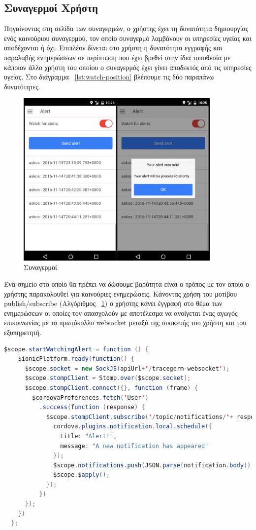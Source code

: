 \subsection{Συναγερμοί Χρήστη}
Πηγαίνοντας στη σελίδα των συναγερμών, ο χρήστης έχει τη δυνατότητα δημιουργίας ενός καινούριου συναγερμού, τον οποίο συναγερμό λαμβάνουν οι υπηρεσίες υγείας και αποδέχονται ή όχι. Επιπλέον δίνεται στο χρήστη η δυνατότητα εγγραφής και παραλαβής ενημερώσεων σε περίπτωση που έχει βρεθεί στην ίδια τοποθεσία με κάποιον άλλο χρήστη του οποίου ο συναγερμός έχει γίνει αποδεκτός από τις υπηρεσίες υγείας. Στο διάγραμμα ~\ref{lst:watch-position} βλέπουμε τις δύο παραπάνω δυνατότητες. 

\begin{figure}[h]
  \centering
  \includegraphics[width=100mm]{images/alerts.jpg}
  \caption{Συναγερμοί}
  \label{fig:alerts}
\end{figure}

\newpage

Ένα σημείο στο οποίο θα πρέπει να δώσουμε βαρύτητα είναι ο τρόπος με τον οποίο ο χρήστης παρακολουθεί για καινούριες ενημερώσεις. Κάνοντας χρήση του μοτίβου publish/subscribe (Αλγόριθμος ~\ref{fig:alerts}) ο χρήστης κάνει έγγραφή στο θέμα των ενημερώσεων οι οποίες τον απασχολούν με αποτέλεσμα να ανοίγεται ένας αγωγός επικοινωνίας με το πρωτόκολλο websocket μεταξύ της συσκευής του χρήστη και του εξυπηρετητή.

\begin{lstlisting}[language=Java, caption=Publish/Subscribe για ενημερώσεις, label={lst:publish_subscribe_notifications}]
$scope.startWatchingAlert = function () {
    $ionicPlatform.ready(function() {
      $scope.socket = new SockJS(apiUrl+'/tracegerm-websocket');
      $scope.stompClient = Stomp.over($scope.socket);
      $scope.stompClient.connect({}, function (frame) {
        $cordovaPreferences.fetch('User')
          .success(function (response) {
            $scope.stompClient.subscribe('/topic/notifications/'+ response.username, function (notification) {
              cordova.plugins.notification.local.schedule({
                title: "Alert!",
                message: "A new notification has appeared"
              });
              $scope.notifications.push(JSON.parse(notification.body));
              $scope.$apply();
            });
          })
      });
    })
  };
\end{lstlisting}

